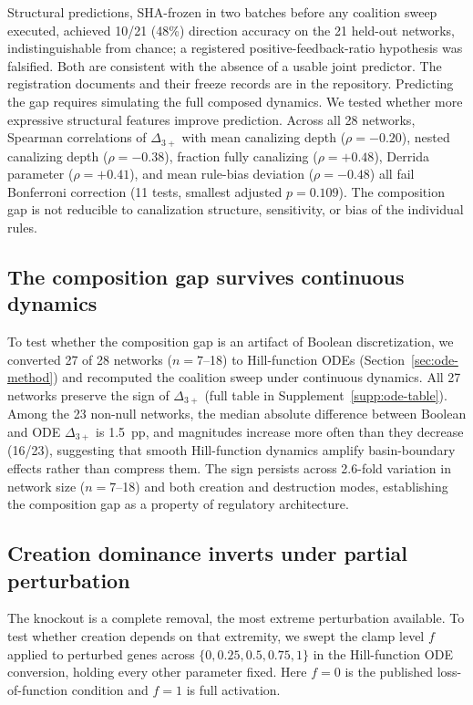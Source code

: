 \documentclass[10pt]{article}
\begin{document}
Structural predictions, SHA-frozen in two batches before any coalition
sweep executed, achieved 10/21 (48\%) direction accuracy on the 21
held-out networks, indistinguishable from chance; a registered
positive-feedback-ratio hypothesis was falsified. Both are consistent
with the absence of a usable joint predictor. The registration
documents and their freeze records are in the repository. Predicting the
gap requires simulating the full
composed dynamics. We tested whether more expressive structural
features improve prediction. Across all 28 networks, Spearman
correlations of $\Delta_{3+}$ with mean canalizing depth
($\rho = -0.20$), nested canalizing depth ($\rho = -0.38$),
fraction fully canalizing ($\rho = +0.48$), Derrida parameter
($\rho = +0.41$), and mean rule-bias deviation ($\rho = -0.48$)
all fail Bonferroni correction (11 tests, smallest adjusted
$p = 0.109$). The composition gap is not reducible to canalization
structure, sensitivity, or bias of the individual rules.


\subsection{The composition gap survives continuous dynamics}
\label{sec:ode-results}

To test whether the composition gap is an artifact of Boolean
discretization, we converted 27 of 28 networks ($n = 7$--18) to
Hill-function ODEs (Section~\ref{sec:ode-method}) and recomputed
the coalition sweep under continuous dynamics. All 27 networks
preserve the sign of $\Delta_{3+}$ (full table in
Supplement~\ref{supp:ode-table}). Among the 23 non-null networks,
the median absolute difference between Boolean and ODE
$\Delta_{3+}$ is 1.5~pp, and magnitudes increase more
often than they decrease (16/23), suggesting that smooth Hill-function
dynamics amplify basin-boundary effects rather than compress them.
The sign persists across 2.6-fold variation in network size
($n = 7$--18) and both creation and destruction modes, establishing
the composition gap as a property of regulatory architecture.


\subsection{Creation dominance inverts under partial perturbation}
\label{sec:graded}

The knockout is a complete removal, the most extreme perturbation
available. To test whether creation depends on that extremity, we swept
the clamp level $f$ applied to perturbed genes across
$\{0, 0.25, 0.5, 0.75, 1\}$ in the Hill-function ODE conversion, holding
every other parameter fixed. Here $f = 0$ is the published
loss-of-function condition and $f = 1$ is full activation.
\end{document}
